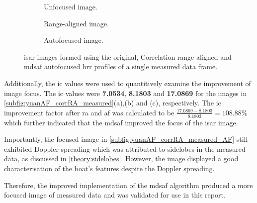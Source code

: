 \documentclass[class=report,11pt,crop=false]{standalone}
\begin{document}
    \begin{figure}[H]
        \centering
        \begin{subfigure}{0.3\linewidth}
            \resizebox{\linewidth}{!}{}
            \caption{Unfocused image. \label{subfig:yuanAF_measured_original}}
        \end{subfigure}
        \hspace{0.5cm}
        \begin{subfigure}{0.3\linewidth}
            \resizebox{\linewidth}{!}{}
            \caption{Range-aligned image. \label{subfig:yuanAF_corrRA_measured_RA}}
        \end{subfigure}
        \hspace{0.5cm}
        \begin{subfigure}{0.3\linewidth}
            \resizebox{\linewidth}{!}{}
            \caption{Autofocused image.\label{subfig:yuanAF_corrRA_measured_AF}}
        \end{subfigure}
        \caption{\gls{isar} images formed using the original, Correlation range-aligned and \gls{mdsaf} autofocused \gls{hrr} profiles of a single measured data frame.} \label{subfig:yuanAF_corrRA_measured}
    \end{figure}

    Additionally, the \gls{ic} values were used to quantitively examine the improvement of image focus. The \gls{ic} values were \textbf{7.0534}, \textbf{8.1803} and \textbf{17.0869} for the images in \autoref{subfig:yuanAF_corrRA_measured}(a),(b) and (c), respectively. The \gls{ic} improvement factor after \gls{ra} and \gls{af} was calculated to be \(\frac{17.0869-8.1803}{8.1803}=108.88\%\) which further indicated that the \gls{mdsaf} improved the focus of the \gls{isar} image.

    Importantly, the focused image in \autoref{subfig:yuanAF_corrRA_measured_AF} still exhibited Doppler spreading which was attributed to sidelobes in the measured data, as discussed in \autoref{theory:sidelobes}. However, the image displayed a good characterisation of the boat's features despite the Doppler spreading.

    Therefore, the improved implementation of the \gls{mdsaf} algorithm produced a more focused image of measured data and was validated for use in this report.
    
\end{document}

